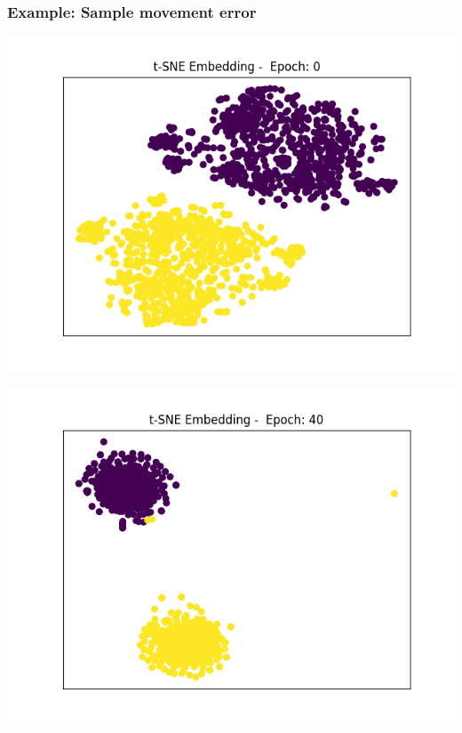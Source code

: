 \begin{frame}\frametitle{Example: Sample movement error}
	\begin{minipage}{0.4\textwidth}
		\includegraphics[width=\textwidth]{images/plot21tSNE}
	\end{minipage}
	\begin{minipage}{0.4\textwidth}
		\includegraphics[width=\textwidth]{images/plot22tSNE}
	\end{minipage}


\end{frame}
